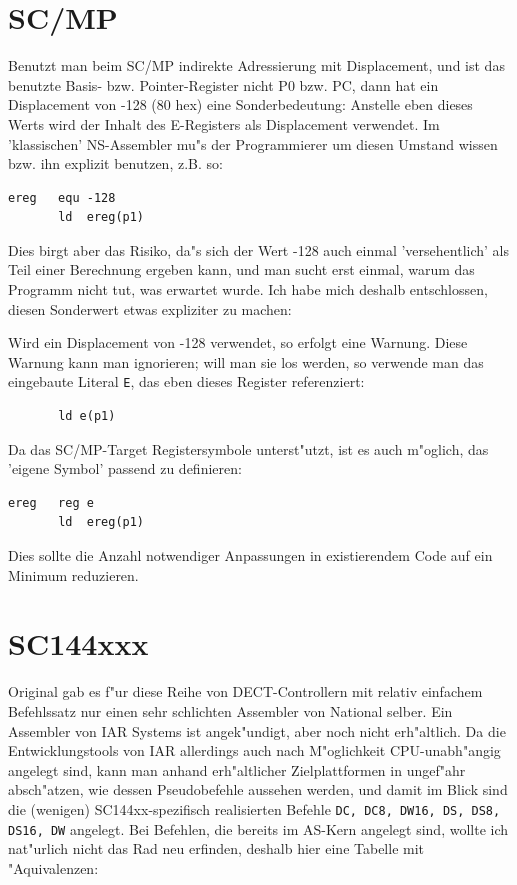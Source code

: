 \documentclass[12pt,a4paper,twoside]{report}
\newcommand{\asname}{AS}
\begin{document}

\section{SC/MP}

Benutzt man beim SC/MP indirekte Adressierung mit Displacement, und
ist das benutzte Basis- bzw. Pointer-Register nicht P0 bzw. PC, dann
hat ein Displacement von -128 (80 hex) eine Sonderbedeutung: Anstelle
eben dieses Werts wird der Inhalt des E-Registers als Displacement
verwendet. Im 'klassischen' NS-Assembler mu"s der Programmierer um
diesen Umstand wissen bzw. ihn explizit benutzen, z.B. so:
\begin{verbatim}
ereg   equ -128
       ld  ereg(p1)
\end{verbatim}
Dies birgt aber das Risiko, da"s sich der Wert -128 auch einmal
'versehentlich' als Teil einer Berechnung ergeben kann, und man
sucht erst einmal, warum das Programm nicht tut, was erwartet
wurde.  Ich habe mich deshalb entschlossen, diesen Sonderwert
etwas expliziter zu machen:

Wird ein Displacement von -128 verwendet, so erfolgt eine Warnung.
Diese Warnung kann man ignorieren; will man sie los werden, so
verwende man das eingebaute Literal \verb!E!, das eben dieses Register
referenziert:
\begin{verbatim}
       ld e(p1)
\end{verbatim} 
Da das SC/MP-Target Registersymbole unterst"utzt, ist es auch m"oglich,
das 'eigene Symbol' passend zu definieren:
\begin{verbatim}
ereg   reg e
       ld  ereg(p1)
\end{verbatim}
Dies sollte die Anzahl notwendiger Anpassungen in existierendem
Code auf ein Minimum reduzieren.


\section{SC144xxx}
\label{SC144xxspec}

Original gab es f"ur diese Reihe von DECT-Controllern mit relativ
einfachem Befehlssatz nur einen sehr schlichten Assembler von National
selber.  Ein Assembler von IAR Systems ist angek"undigt, aber noch nicht
erh"altlich.  Da die Entwicklungstools von IAR allerdings auch nach
M"oglichkeit CPU-unabh"angig angelegt sind, kann man anhand erh"altlicher
Zielplattformen in ungef"ahr absch"atzen, wie dessen Pseudobefehle
aussehen werden, und damit im Blick sind die (wenigen) SC144xx-spezifisch
realisierten Befehle {\tt DC, DC8, DW16, DS, DS8, DS16, DW} angelegt. Bei
Befehlen, die bereits im \asname{}-Kern angelegt sind, wollte ich nat"urlich
nicht das Rad neu erfinden, deshalb hier eine Tabelle mit "Aquivalenzen:
\end{document}
